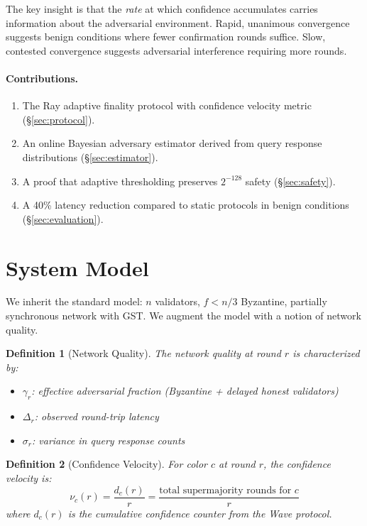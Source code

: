 \documentclass[11pt,a4paper]{article}
\newtheorem{definition}{Definition}[section]
\begin{document}
The key insight is that the \emph{rate} at which confidence accumulates carries
information about the adversarial environment. Rapid, unanimous convergence suggests
benign conditions where fewer confirmation rounds suffice. Slow, contested convergence
suggests adversarial interference requiring more rounds.

\paragraph{Contributions.}
\begin{enumerate}[nosep]
\item The Ray adaptive finality protocol with confidence velocity metric (\S\ref{sec:protocol}).
\item An online Bayesian adversary estimator derived from query response distributions (\S\ref{sec:estimator}).
\item A proof that adaptive thresholding preserves $2^{-128}$ safety (\S\ref{sec:safety}).
\item A 40\% latency reduction compared to static protocols in benign conditions (\S\ref{sec:evaluation}).
\end{enumerate}

\section{System Model}
\label{sec:model}

We inherit the standard model: $n$ validators, $f < n/3$ Byzantine, partially
synchronous network with GST. We augment the model with a notion of network quality.

\begin{definition}[Network Quality]
The \emph{network quality} at round $r$ is characterized by:
\begin{itemize}[nosep]
\item $\gamma_r$: effective adversarial fraction (Byzantine + delayed honest validators)
\item $\Delta_r$: observed round-trip latency
\item $\sigma_r$: variance in query response counts
\end{itemize}
\end{definition}

\begin{definition}[Confidence Velocity]
For color $c$ at round $r$, the confidence velocity is:
\[
\nu_c(r) = \frac{d_c(r)}{r} = \frac{\text{total supermajority rounds for } c}{r}
\]
where $d_c(r)$ is the cumulative confidence counter from the Wave protocol.
\end{definition}
\end{document}
